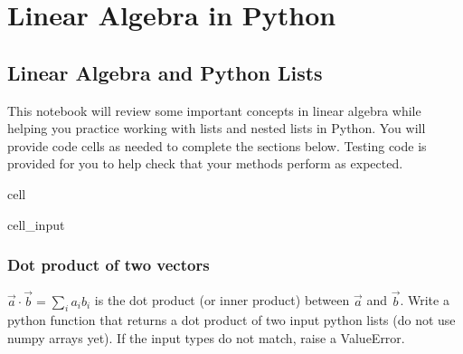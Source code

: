 \documentclass[letterpaper,10pt,english]{jupyterBook}
\begin{document}
\sphinxstepscope


\part{Linear Algebra in Python}

\sphinxstepscope


\chapter{Linear Algebra and Python Lists}
\label{\detokenize{lessons/Matrices-student:linear-algebra-and-python-lists}}\label{\detokenize{lessons/Matrices-student::doc}}
\sphinxAtStartPar
This notebook will review some important concepts in linear algebra while helping you practice working with lists and nested lists in Python. You will provide code cells as needed to complete the sections below. Testing code is provided for you to help check that your methods perform as expected.

\begin{sphinxuseclass}{cell}\begin{sphinxVerbatimInput}

\begin{sphinxuseclass}{cell_input}
\begin{sphinxVerbatim}[commandchars=\\\{\}]
   
     
 
\end{sphinxVerbatim}

\end{sphinxuseclass}\end{sphinxVerbatimInput}

\end{sphinxuseclass}

\section{Dot product of two vectors}
\label{\detokenize{lessons/Matrices-student:dot-product-of-two-vectors}}
\sphinxAtStartPar
\(\vec{a} \cdot \vec{b} = \sum_i a_ib_i\) is the dot product (or inner product) between \(\vec{a}\) and \(\vec{b}\). Write a python function  that returns a dot product of two input python lists (do not use numpy arrays yet). If the input types do not match, raise a ValueError.
\end{document}
